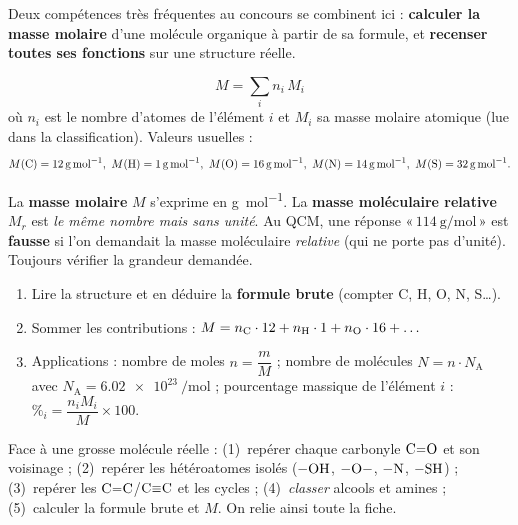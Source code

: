 \documentclass[11pt,a4paper]{article}
\begin{document}

Deux compétences très fréquentes au concours se combinent ici : \textbf{calculer la masse molaire} d'une molécule organique à partir de sa formule, et \textbf{recenser toutes ses fonctions} sur une structure réelle.

\begin{cle}
\[
\boxed{\,M=\sum_i n_i\,M_i\,}
\]
où $n_i$ est le nombre d'atomes de l'élément $i$ et $M_i$ sa masse molaire atomique (lue dans la classification). Valeurs usuelles :
\[
M(\ce{C})=\qty{12}{\gram\per\mole},\ M(\ce{H})=\qty{1}{\gram\per\mole},\ M(\ce{O})=\qty{16}{\gram\per\mole},\ M(\ce{N})=\qty{14}{\gram\per\mole},\ M(\ce{S})=\qty{32}{\gram\per\mole}.
\]
\end{cle}

\begin{piege}
La \textbf{masse molaire} $M$ s'exprime en \si{\gram\per\mole}. La \textbf{masse moléculaire relative} $M_r$ est \emph{le même nombre mais sans unité}. Au QCM, une réponse «\,$114\ \mathrm{g/mol}$\,» est \textbf{fausse} si l'on demandait la masse moléculaire \emph{relative} (qui ne porte pas d'unité). Toujours vérifier la grandeur demandée.
\end{piege}

\begin{methode}
\begin{enumerate}[leftmargin=1.6em,itemsep=0.5pt]
  \item Lire la structure et en déduire la \textbf{formule brute} (compter C, H, O, N, S\dots).
  \item Sommer les contributions : $M=n_{\ce{C}}\cdot 12 + n_{\ce{H}}\cdot 1 + n_{\ce{O}}\cdot 16 + \dots$
  \item Applications : nombre de moles $n=\dfrac{m}{M}$ ; nombre de molécules $N=n\cdot N_{\mathrm{A}}$ avec $N_{\mathrm{A}}=\qty{6.02e23}{\per\mole}$ ; pourcentage massique de l'élément $i$ : $\%_i=\dfrac{n_i M_i}{M}\times 100$.
\end{enumerate}
\end{methode}

\begin{cle}
Face à une grosse molécule réelle : (1)~repérer chaque carbonyle $\ce{C=O}$ et son voisinage ; (2)~repérer les hétéroatomes isolés ($-\ce{OH}$, $-\ce{O}-$, $-\ce{N}$, $-\ce{SH}$) ; (3)~repérer les $\ce{C=C}$/$\ce{C#C}$ et les cycles ; (4)~\emph{classer} alcools et amines ; (5)~calculer la formule brute et $M$. On relie ainsi toute la fiche.
\end{cle}
\end{document}
